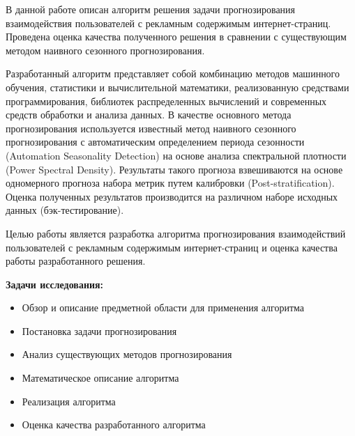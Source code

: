 В данной работе описан алгоритм решения задачи прогнозирования взаимодействия пользователей с рекламным 
содержимым интернет-страниц. Проведена оценка качества полученного решения в сравнении с существующим методом
наивного сезонного прогнозирования. 

Разработанный алгоритм представляет собой комбинацию методов машинного обучения, 
статистики и вычислительной математики, реализованную средствами программирования, библиотек распределенных
вычислений и современных средств обработки и анализа данных. В качестве основного метода прогнозирования 
используется известный метод наивного сезонного прогнозирования с автоматическим определением периода 
сезонности (Automation Seasonality Detection) на основе анализа спектральной плотности (Power Spectral Density).
Результаты такого прогноза взвешиваются на основе одномерного прогноза набора метрик путем калибровки
(Post-stratification). Оценка полученных результатов производится на различном наборе исходных данных
 (бэк-тестирование).

Целью работы является разработка алгоритма прогнозирования взаимодействий пользователей с рекламным содержимым
интернет-страниц и оценка качества работы разработанного решения.

\textbf{Задачи исследования:}
\begin{itemize}
    \item Обзор и описание предметной области для применения алгоритма
    \item Постановка задачи прогнозирования
    \item Анализ существующих методов прогнозирования
    \item Математическое описание алгоритма
    \item Реализация алгоритма
    \item Оценка качества разработанного алгоритма
\end{itemize}